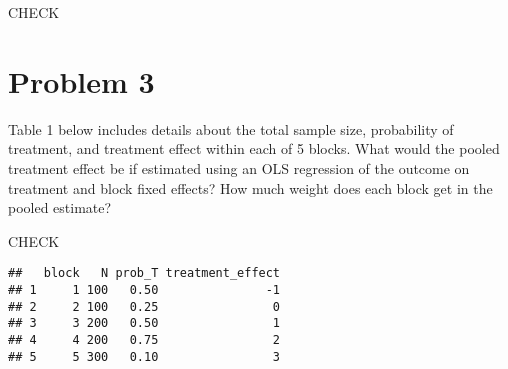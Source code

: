 \documentclass[
]{article}
\newenvironment{Shaded}{\begin{snugshade}}{\end{snugshade}}
\newcommand{\DecValTok}[1]{\textcolor[rgb]{0.00,0.00,0.81}{#1}}
\newcommand{\FloatTok}[1]{\textcolor[rgb]{0.00,0.00,0.81}{#1}}
\newcommand{\FunctionTok}[1]{\textcolor[rgb]{0.00,0.00,0.00}{#1}}
\newcommand{\NormalTok}[1]{#1}
\newcommand{\OtherTok}[1]{\textcolor[rgb]{0.56,0.35,0.01}{#1}}
\newcommand{\SpecialCharTok}[1]{\textcolor[rgb]{0.00,0.00,0.00}{#1}}
\begin{document}
CHECK

\newpage

\hypertarget{problem-3}{%
\section{Problem 3}\label{problem-3}}

Table 1 below includes details about the total sample size, probability
of treatment, and treatment effect within each of 5 blocks. What would
the pooled treatment effect be if estimated using an OLS regression of
the outcome on treatment and block fixed effects? How much weight does
each block get in the pooled estimate?

CHECK

\begin{Shaded}
\end{Shaded}

\begin{verbatim}
##   block   N prob_T treatment_effect
## 1     1 100   0.50               -1
## 2     2 100   0.25                0
## 3     3 200   0.50                1
## 4     4 200   0.75                2
## 5     5 300   0.10                3
\end{verbatim}
\end{document}
